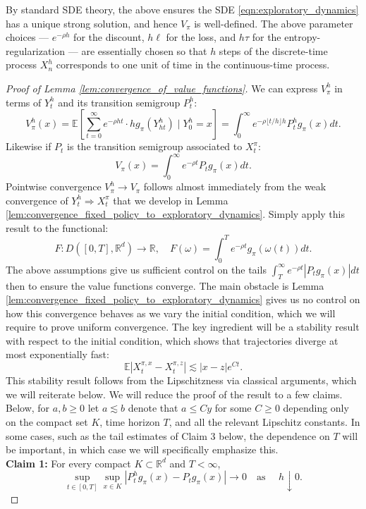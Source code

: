 \documentclass[11pt,oneside,reqno]{article}
\theoremstyle{plain}
\theoremstyle{definition}
\numberwithin{equation}{section}
\renewcommand{\leq}{\leqslant}
\renewcommand{\geq}{\geqslant}
\newcommand{\R}{\mathbb{R}}
\newcommand{\E}{\mathbb{E}}
\begin{document}
	By standard SDE theory, the above ensures the SDE \eqref{eqn:exploratory_dynamics} 
	has a unique strong solution, and hence $V_\pi$ is well-defined. The above parameter choices --- $e^{-\rho h}$ for the discount, $h\ell$ for the loss, and 
	$h \tau$ for the entropy-regularization --- are essentially chosen so that $h$ steps of the discrete-time process $X^{h}_n$ corresponds to one unit of time
	in the continuous-time process.

\begin{proof}[Proof of Lemma \ref{lem:convergence_of_value_functions}]
	We can express $V_\pi^h$ in terms of $Y^h_t$ and its transition semigroup $P^h_t$:
	\[V_\pi^h(x) = \E\left[ \sum_{t=0}^\infty e^{-\rho h t} \cdot h g_\pi(Y^h_{ht}) \;\bigg\vert\; Y^h_0 = x\right] = \int_0^\infty e^{-\rho \lfloor t/h \rfloor h} P_t^hg_\pi(x) dt.\]
	\noindent Likewise if $P_t$ is the transition semigroup associated to $X_t^\pi$:
	\[V_\pi(x) = \int_0^\infty e^{-\rho t} P_tg_\pi(x) dt.\]
	\noindent Pointwise convergence $V^h_\pi \to V_\pi$ follows almost immediately from the weak
	convergence of $Y^h_t \Rightarrow X^\pi_t$ that we develop in Lemma \ref{lem:convergence_fixed_policy_to_exploratory_dynamics}. Simply apply this result to the functional:
	\[F:D([0,T], \R^d) \to \R, \quad F(\omega) = \int_0^T e^{-\rho t} g_\pi(\omega(t)) dt.\]
	The above assumptions give us sufficient control on the tails $\int_T^\infty e^{-\rho t} |P_t g_\pi(x)| dt$ then to ensure the value 
	functions converge. The main obstacle is Lemma \ref{lem:convergence_fixed_policy_to_exploratory_dynamics} gives us no control on how this convergence
	behaves as we vary the initial condition, which we will require to prove uniform convergence. The key ingredient will be a stability result
	with respect to the initial condition, which shows that trajectories diverge at most exponentially fast:
	\[\E |X_t^{\pi, x} - X_t^{\pi, z}| \lesssim |x-z| e^{Ct}.\]
	This stability result follows from the Lipschitzness via classical arguments, which we will reiterate below.
	We will reduce the proof of the result to a few claims. Below, for $a,b \geq 0$ let $a \lesssim b$ denote that $a \leq Cy$ for some $C \geq 0$ depending
	only on the compact set $K$, time horizon $T$, and all the relevant Lipschitz constants. In some cases, such as the tail estimates of Claim 3 below,
	the dependence on $T$ will be important, in which case we will specifically emphasize this. \\
	
	\noindent \textbf{Claim 1:} For every compact $K\subset \R^d$ and $T<\infty$,
    \[
		\sup_{t\in[0,T]}\sup_{x\in K}|P_t^h g_\pi(x)-P_t g_\pi(x)|\to 0
		\quad \text{as } \quad h\downarrow 0.
		\]


\end{proof}
\end{document}
